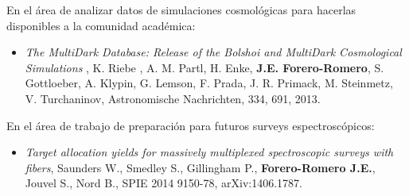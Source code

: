 \noindent 
En el \'area de analizar datos de simulaciones cosmol\'ogicas
para hacerlas disponibles a la comunidad acad\'emica:

\begin{itemize}
\item{\it The MultiDark Database: Release of the Bolshoi and
  MultiDark Cosmological Simulations} , K. Riebe , A. M. Partl,
  H. Enke, {\bf J.E. Forero-Romero}, S. Gottloeber, A. Klypin,
  G. Lemson, F. Prada, J. R. Primack, M. Steinmetz, V. Turchaninov,
  Astronomische Nachrichten, 334, 691, 2013. 
\end{itemize}

\noindent 
En el \'area de trabajo de preparaci\'on para futuros surveys
espectrosc\'opicos:
\begin{itemize}
\item{\it Target allocation yields for massively multiplexed
  spectroscopic surveys with fibers}, Saunders W., Smedley S.,
  Gillingham P., {\bf Forero-Romero J.E.}, Jouvel S., Nord B., 
  SPIE 2014 9150-78, arXiv:1406.1787.
\end{itemize}
